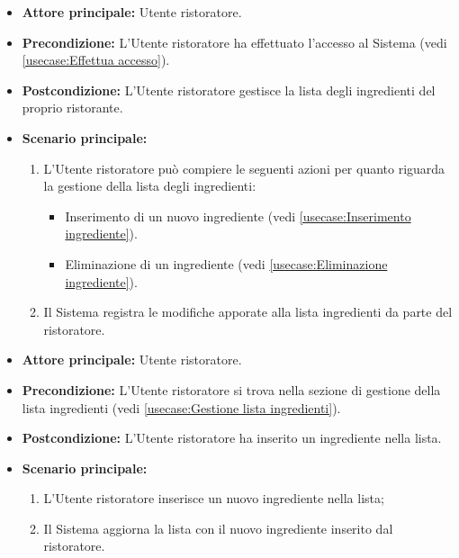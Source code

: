 \label{usecase:Gestione lista ingredienti}
\begin{itemize}
	\item \textbf{Attore principale:} Utente ristoratore.

	\item \textbf{Precondizione:} L'Utente ristoratore ha effettuato l'accesso al Sistema (vedi \autoref{usecase:Effettua accesso}).

	\item \textbf{Postcondizione:} L'Utente ristoratore gestisce la lista degli ingredienti del proprio ristorante.


	\item \textbf{Scenario principale:}
	      \begin{enumerate}

		      \item L'Utente ristoratore può compiere le seguenti azioni per quanto riguarda la gestione della lista degli ingredienti:
		      \begin{itemize}
                \item Inserimento di un nuovo ingrediente (vedi \autoref{usecase:Inserimento ingrediente}).
                \item Eliminazione di un ingrediente (vedi \autoref{usecase:Eliminazione ingrediente}).
              \end{itemize}
		      \item Il Sistema registra le modifiche apporate alla lista ingredienti da parte del ristoratore.

	      \end{enumerate}
\end{itemize}

\label{usecase:Inserimento ingrediente}
\begin{itemize}

	\item \textbf{Attore principale:} Utente ristoratore.

	\item \textbf{Precondizione:} L'Utente ristoratore si trova nella sezione di gestione della lista ingredienti (vedi \autoref{usecase:Gestione lista ingredienti}).

	\item \textbf{Postcondizione:} L'Utente ristoratore ha inserito un ingrediente nella lista.

	\item \textbf{Scenario principale:}
	\begin{enumerate}
		\item L'Utente ristoratore inserisce un nuovo ingrediente nella lista;
		\item Il Sistema aggiorna la lista con il nuovo ingrediente inserito dal ristoratore.
	\end{enumerate}

\end{itemize}

